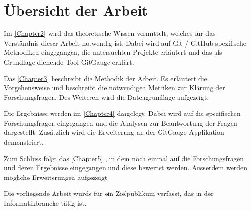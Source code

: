 






\section{Übersicht der Arbeit}
Im \autoref{Chapter2} \textit{} wird das theoretische Wissen vermittelt, welches für das Verständnis dieser Arbeit notwendig ist. Dabei wird auf  Git / GitHub spezifische Methodiken eingegangen, die untersuchten Projekte erläutert und das als Grundlage dienende Tool GitGauge erklärt.

Das \autoref{Chapter3} \textit{} beschreibt die Methodik der Arbeit. Es erläutert die Vorgehensweise und beschreibt die notwendigen Metriken zur Klärung der Forschungsfragen. Des Weiteren wird die Datengrundlage aufgezeigt.


Die Ergebnisse werden im \autoref{Chapter4} \textit{} dargelegt. Dabei wird auf die spezifischen Forschungsfragen eingegangen und die Analysen zur Beantwortung der Fragen dargestellt. Zusätzlich wird die Erweiterung an der GitGauge-Applikation demonstriert.

Zum Schluss folgt das \autoref{Chapter5} \textit{}, in dem noch einmal auf die Forschungsfragen und deren Ergebnisse eingegangen und diese bewertet werden. Ausserdem werden mögliche Erweiterungen aufgezeigt.
\newpage
\noindent
\vspace*{\fill} %
\begin{center}
    Die vorliegende Arbeit wurde für ein Zielpublikum verfasst, das in der Informatikbranche tätig ist.
\end{center}
\vspace*{\fill}




